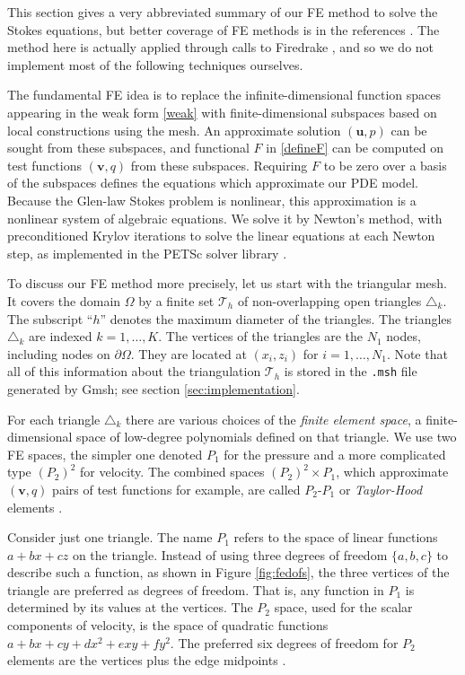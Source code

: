 \documentclass[letterpaper,final,12pt,reqno]{amsart}
\newcommand{\bu}{\mathbf{u}}
\newcommand{\bv}{\mathbf{v}}
\begin{document}
This section gives a very abbreviated summary of our FE method to solve the Stokes equations, but better coverage of FE methods is in the references \cite{Braess2007,BuelerBook,Elmanetal2014}.  The method here is actually applied through calls to Firedrake \cite{Rathgeberetal2016}, and so we do not implement most of the following techniques ourselves.

The fundamental FE idea is to replace the infinite-dimensional function spaces appearing in the weak form \eqref{weak} with finite-dimensional subspaces based on local constructions using the mesh.  An approximate solution $(\bu,p)$ can be sought from these subspaces, and functional $F$ in \eqref{defineF} can be computed on test functions $(\bv,q)$ from these subspaces.  Requiring $F$ to be zero over a basis of the subspaces defines the equations which approximate our PDE model.  Because the Glen-law Stokes problem is nonlinear, this approximation is a nonlinear system of algebraic equations.  We solve it by Newton's method, with preconditioned Krylov iterations to solve the linear equations at each Newton step, as implemented in the PETSc solver library \cite{Balayetal2018,BuelerBook}.

To discuss our FE method more precisely, let us start with the triangular mesh.  It covers the domain $\Omega$ by a finite set $\mathcal{T}_h$ of non-overlapping open triangles $\triangle_k$.  The subscript ``$h$'' denotes the maximum diameter of the triangles.  The triangles $\triangle_k$ are indexed $k=1,\dots,K$.  The vertices of the triangles are the $N_1$ nodes, including nodes on $\partial\Omega$.  They are located at $(x_i,z_i)$ for $i=1,\dots,N_1$.  Note that all of this information about the triangulation $\mathcal{T}_h$ is stored in the \texttt{.msh} file generated by Gmsh; see section \ref{sec:implementation}.

For each triangle $\triangle_k$ there are various choices of the \emph{finite element space}, a finite-dimensional space of low-degree polynomials defined on that triangle.  We use two FE spaces, the simpler one denoted $P_1$ for the pressure and a more complicated type $(P_2)^2$ for velocity.  The combined spaces $(P_2)^2 \times P_1$, which approximate $(\bv,q)$ pairs of test functions for example, are called $P_2$-$P_1$ or \emph{Taylor-Hood} elements \cite{Elmanetal2014}.

Consider just one triangle.  The name $P_1$ refers to the space of linear functions $a + b x + c z$ on the triangle.  Instead of using three degrees of freedom $\{a,b,c\}$ to describe such a function, as shown in Figure \ref{fig:fedofs}, the three vertices of the triangle are preferred as degrees of freedom.  That is, any function in $P_1$ is determined by its values at the vertices.  The $P_2$ space, used for the scalar components of velocity, is the space of quadratic functions $a + bx + cy + dx^2 + exy + fy^2$.  The preferred six degrees of freedom for $P_2$ elements are the vertices plus the edge midpoints \cite{Elmanetal2014}.
\end{document}
